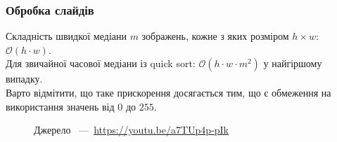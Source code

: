 \begin{frame}
    \frametitle{Обробка слайдів}
    Складність швидкої медіани $m$ зображень, кожне з яких розміром $h \times w$:
    $\mathcal{O}(h \cdot w).$ \\
    Для звичайної часової медіани із quick sort: $\mathcal{O}(h \cdot w \cdot m^2)$ у найгіршому випадку. \\
    Варто відмітити, що таке прискорення досягається тим,
    що є обмеження на використання значень від $0$ до $255$.
    \begin{figure}[H]
        \centering
        \caption{Джерело ~---~\url{https://youtu.be/a7TUp4p-pIk}
        }
    \end{figure}
\end{frame}
